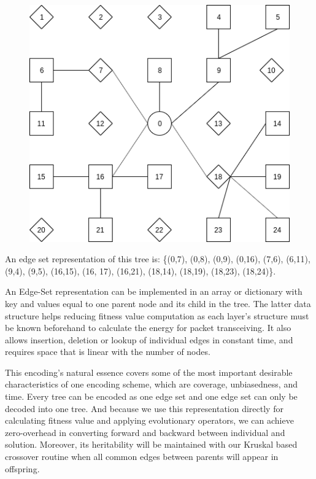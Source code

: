 
\begin{figure}
	\centering
	\includegraphics[scale=0.4]{Images/EdgeSetRepresentation}
\end{figure}

	An edge set representation of this tree is: \{(0,7), (0,8), (0,9), (0,16), (7,6), (6,11), (9,4), (9,5), (16,15), (16, 17), (16,21), (18,14), (18,19), (18,23), (18,24)\}.

	An Edge-Set representation can be implemented in an array or dictionary with key and values equal to one parent node and its child in the tree. The latter data structure helps reducing fitness value computation as each layer’s structure must be known beforehand to calculate the energy for packet transceiving. It also allows insertion, deletion or lookup of individual edges in constant time, and requires space that is linear with the number of nodes.

	This encoding’s natural essence covers some of the most important desirable characteristics of one encoding scheme, which are coverage, unbiasedness, and time. Every tree can be encoded as one edge set and one edge set can only be decoded into one tree. And because we use this representation directly for calculating fitness value and applying evolutionary operators, we can achieve zero-overhead in converting forward and backward between individual and solution. Moreover, its heritability will be maintained with our Kruskal based crossover routine when all common edges between parents will appear in offspring.


